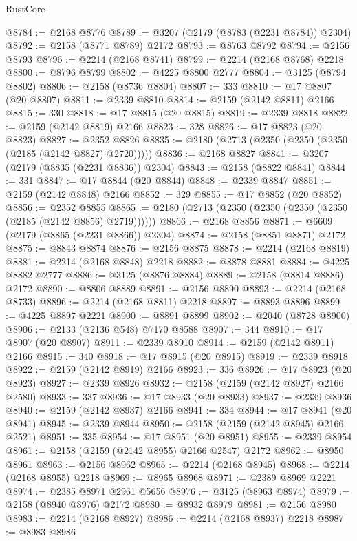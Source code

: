 \begin{lexlean}{RustCore}
\begin{coremodule}
@8784 := @2168 @8776
@8789 := @3207 (@2179 (@8783 (@2231 @8784)) @2304)
@8792 := @2158 (@8771 @8789) @2172
@8793 := @8763 @8792
@8794 := @2156 @8793
@8796 := @2214 (@2168 @8741)
@8799 := @2214 (@2168 @8768) @2218
@8800 := @8796 @8799
@8802 := @4225 @8800 @2777
@8804 := @3125 (@8794 @8802)
@8806 := @2158 (@8736 @8804)
@8807 := 333
@8810 := @17 @8807 (@20 @8807)
@8811 := @2339 @8810
@8814 := @2159 (@2142 @8811) @2166
@8815 := 330
@8818 := @17 @8815 (@20 @8815)
@8819 := @2339 @8818
@8822 := @2159 (@2142 @8819) @2166
@8823 := 328
@8826 := @17 @8823 (@20 @8823)
@8827 := @2352 @8826
@8835 := @2180 (@2713 (@2350 (@2350 (@2350 (@2185 (@2142 @8827) @2720)))))
@8836 := @2168 @8827
@8841 := @3207 (@2179 (@8835 (@2231 @8836)) @2304)
@8843 := @2158 (@8822 @8841)
@8844 := 331
@8847 := @17 @8844 (@20 @8844)
@8848 := @2339 @8847
@8851 := @2159 (@2142 @8848) @2166
@8852 := 329
@8855 := @17 @8852 (@20 @8852)
@8856 := @2352 @8855
@8865 := @2180 (@2713 (@2350 (@2350 (@2350 (@2350 (@2185 (@2142 @8856) @2719))))))
@8866 := @2168 @8856
@8871 := @6609 (@2179 (@8865 (@2231 @8866)) @2304)
@8874 := @2158 (@8851 @8871) @2172
@8875 := @8843 @8874
@8876 := @2156 @8875
@8878 := @2214 (@2168 @8819)
@8881 := @2214 (@2168 @8848) @2218
@8882 := @8878 @8881
@8884 := @4225 @8882 @2777
@8886 := @3125 (@8876 @8884)
@8889 := @2158 (@8814 @8886) @2172
@8890 := @8806 @8889
@8891 := @2156 @8890
@8893 := @2214 (@2168 @8733)
@8896 := @2214 (@2168 @8811) @2218
@8897 := @8893 @8896
@8899 := @4225 @8897 @2221
@8900 := @8891 @8899
@8902 := @2040 (@8728 @8900)
@8906 := @2133 (@2136 @548) @7170 @8588
@8907 := 344
@8910 := @17 @8907 (@20 @8907)
@8911 := @2339 @8910
@8914 := @2159 (@2142 @8911) @2166
@8915 := 340
@8918 := @17 @8915 (@20 @8915)
@8919 := @2339 @8918
@8922 := @2159 (@2142 @8919) @2166
@8923 := 336
@8926 := @17 @8923 (@20 @8923)
@8927 := @2339 @8926
@8932 := @2158 (@2159 (@2142 @8927) @2166 @2580)
@8933 := 337
@8936 := @17 @8933 (@20 @8933)
@8937 := @2339 @8936
@8940 := @2159 (@2142 @8937) @2166
@8941 := 334
@8944 := @17 @8941 (@20 @8941)
@8945 := @2339 @8944
@8950 := @2158 (@2159 (@2142 @8945) @2166 @2521)
@8951 := 335
@8954 := @17 @8951 (@20 @8951)
@8955 := @2339 @8954
@8961 := @2158 (@2159 (@2142 @8955) @2166 @2547) @2172
@8962 := @8950 @8961
@8963 := @2156 @8962
@8965 := @2214 (@2168 @8945)
@8968 := @2214 (@2168 @8955) @2218
@8969 := @8965 @8968
@8971 := @2389 @8969 @2221
@8974 := @2385 @8971 @2961 @5656
@8976 := @3125 (@8963 @8974)
@8979 := @2158 (@8940 @8976) @2172
@8980 := @8932 @8979
@8981 := @2156 @8980
@8983 := @2214 (@2168 @8927)
@8986 := @2214 (@2168 @8937) @2218
@8987 := @8983 @8986

\end{coremodule}
\end{lexlean}
